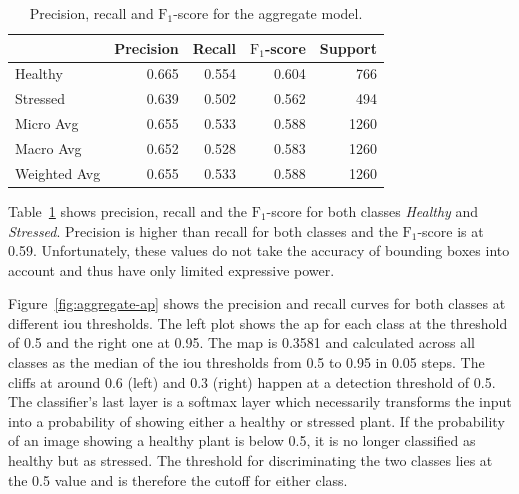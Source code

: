 \documentclass[draft,final]{vutinfth} %
\begin{document}
\begin{table}
  \centering
  \begin{tabular}{lrrrr}
    \toprule
    {} &  Precision &  Recall &  $\mathrm{F}_{1}$-score &  Support \\
    \midrule
    Healthy      &      \num{0.665} &   \num{0.554} &     \num{0.604} &    \num{766} \\
    Stressed     &      \num{0.639} &   \num{0.502} &     \num{0.562} &    \num{494} \\
    Micro Avg    &      \num{0.655} &   \num{0.533} &     \num{0.588} &   \num{1260} \\
    Macro Avg    &      \num{0.652} &   \num{0.528} &     \num{0.583} &   \num{1260} \\
    Weighted Avg &      \num{0.655} &   \num{0.533} &     \num{0.588} &   \num{1260} \\
    \bottomrule
  \end{tabular}
  \caption{Precision, recall and $\mathrm{F}_1$-score for the
    aggregate model.}
  \label{tab:model-metrics}
\end{table}

Table~\ref{tab:model-metrics} shows precision, recall and the
$\mathrm{F}_1$-score for both classes \emph{Healthy} and
\emph{Stressed}. Precision is higher than recall for both classes and
the $\mathrm{F}_1$-score is at \num{0.59}. Unfortunately, these values
do not take the accuracy of bounding boxes into account and thus have
only limited expressive power.

Figure~\ref{fig:aggregate-ap} shows the precision and recall curves
for both classes at different \gls{iou} thresholds. The left plot
shows the \gls{ap} for each class at the threshold of \num{0.5} and
the right one at \num{0.95}. The \gls{map} is \num{0.3581} and
calculated across all classes as the median of the \gls{iou}
thresholds from \num{0.5} to \num{0.95} in \num{0.05} steps. The
cliffs at around \num{0.6} (left) and \num{0.3} (right) happen at a
detection threshold of \num{0.5}. The classifier's last layer is a
softmax layer which necessarily transforms the input into a
probability of showing either a healthy or stressed plant. If the
probability of an image showing a healthy plant is below \num{0.5}, it
is no longer classified as healthy but as stressed. The threshold for
discriminating the two classes lies at the \num{0.5} value and is
therefore the cutoff for either class.
\end{document}
